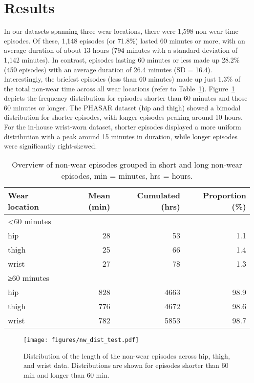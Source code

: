 \documentclass[
  10pt,
]{scrbook}
\begin{document}
\hypertarget{results-1}{%
\section{Results}\label{results-1}}

In our datasets spanning three wear locations, there were 1,598 non-wear
time episodes. Of these, 1,148 episodes (or 71.8\%) lasted 60 minutes or
more, with an average duration of about 13 hours (794 minutes with a
standard deviation of 1,142 minutes). In contrast, episodes lasting 60
minutes or less made up 28.2\% (450 episodes) with an average duration
of 26.4 minutes (SD = 16.4). Interestingly, the briefest episodes (less
than 60 minutes) made up just 1.3\% of the total non-wear time across
all wear locations (refer to Table~\ref{tbl-9}).
Figure~\ref{fig-paper2_nw_dists} depicts the frequency distribution for
episodes shorter than 60 minutes and those 60 minutes or longer. The
PHASAR dataset (hip and thigh) showed a bimodal distribution for shorter
episodes, with longer episodes peaking around 10 hours. For the in-house
wrist-worn dataset, shorter episodes displayed a more uniform
distribution with a peak around 15 minutes in duration, while longer
episodes were significantly right-skewed.

\begingroup

\footnotesize

\hypertarget{tbl-9}{}
\begin{longtable}{lrrr}
\caption{\label{tbl-9}Overview of non-wear episodes grouped in short and long non-wear
episodes, min = minutes, hrs = hours. }\tabularnewline

\toprule
Wear location & Mean (min) & Cumulated (hrs) & Proportion (\%) \\ 
\midrule
\multicolumn{4}{l}{<60 minutes} \\ 
\midrule
hip & 28 & 53 & 1.1 \\ 
thigh & 25 & 66 & 1.4 \\ 
wrist & 27 & 78 & 1.3 \\ 
\midrule
\multicolumn{4}{l}{≥60 minutes} \\ 
\midrule
hip & 828 & 4663 & 98.9 \\ 
thigh & 776 & 4672 & 98.6 \\ 
wrist & 782 & 5853 & 98.7 \\ 
\bottomrule
\end{longtable}

\endgroup

\begin{figure}

{\centering \texttt{[image: figures/nw\_dist\_test.pdf]}

}

\caption{\label{fig-paper2_nw_dists}Distribution of the length of the
non-wear episodes across hip, thigh, and wrist data. Distributions are
shown for episodes shorter than 60 min and longer than 60 min.}

\end{figure}
\end{document}
